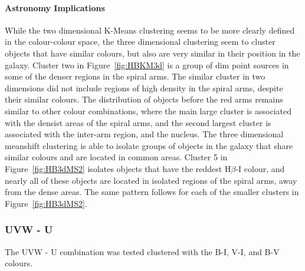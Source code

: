 \paragraph{Astronomy Implications}
While the two dimensional K-Means clustering seems to be more clearly defined in the colour-colour space, the three dimensional clustering seem to cluster objects that have similar colours, but also are very similar in their position in the galaxy.
Cluster two in Figure~\ref{fig:HBKM3d} is a group of dim point sources in some of the denser regions in the spiral arms. 
The similar cluster in two dimensions did not include regions of high density in the spiral arms, despite their similar colours.
The distribution of objects before the red arms remains similar to other colour combinations, where the main large cluster is associated with the densist areas of the spiral arms, and the second largest cluster is associated with the inter-arm region, and the nucleus.
The three dimensional meanshift clustering is able to isolate groups of objects in the galaxy that share similar colours and are located in common areas. 
Cluster 5 in Figure~\ref{fig:HB3dMS2} isolates objects that have the reddest H$\beta$-I colour, and nearly all of these objects are located in isolated regions of the spiral arms, away from the dense areas.
The same pattern follows for each of the smaller clusters in Figure~\ref{fig:HB3dMS2}.


\subsubsection{UVW - U}
The UVW - U combination was tested clustered with the B-I, V-I, and B-V colours. %

